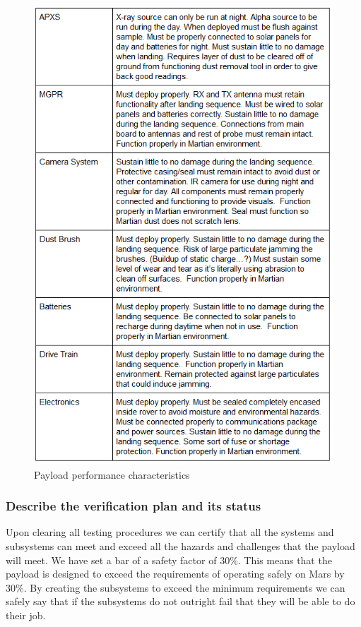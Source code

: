 \documentclass[%
 portrait,
 aapm,
 mph,%
 amsmath,amssymb,
 reprint,%
]{revtex4-2}
\begin{document}
\begin{figure}
  \includegraphics[width=400pt]{Instruments/PayloadPerformanceCharacteristics.png}
   \caption{Payload performance characteristics}
\end{figure} 

\subsubsection{Describe the verification plan and its status}
Upon clearing all testing procedures we can certify that all the systems and subsystems can meet and exceed all the hazards and challenges that the payload will meet.  We have set a bar of a safety factor of 30\%. This means that the payload is designed to exceed the requirements of operating safely on Mars by 30\%. By creating the subsystems to exceed the minimum requirements we can safely say that if the subsystems do not outright fail that they will be able to do their job.
\end{document}
